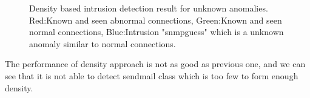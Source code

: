 \begin{figure}[htb2]
\begin{center}
\end{center}
\caption{Density based intrusion detection result for unknown anomalies.  Red:Known and seen abnormal connections, Green:Known and seen normal connections, Blue:Intrusion "snmpguess" which is a unknown anomaly similar to normal connections.} %
\label{fig:refSingleRobot1}
\end{figure}

The performance of density approach is not as good as previous one, and we can see that it is not able to detect sendmail class which is too few to form enough density. 
\begin{table}[h]
\begin{center}
\end{center}
\caption{Unknown anomalies that is similar to known normals detection rate}
\label{fig:refSingleRobot1}
\end{table}

